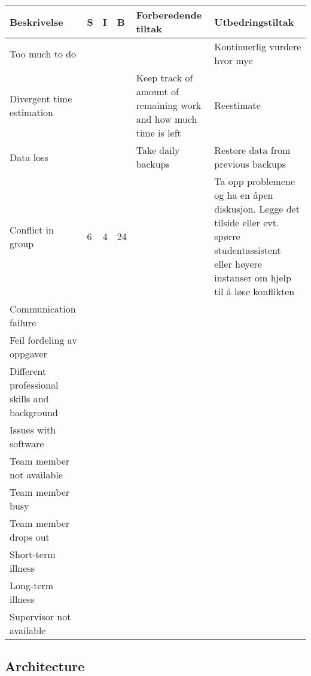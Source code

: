 \begin{table}[H]
\begin{tabular}{|p{4cm}|l|l|l|p{4.5cm}|p{4.5cm}|}
\hline
Beskrivelse  &S& I& B& Forberedende tiltak & Utbedringstiltak \\\hline
Too much to do&&&&& Kontinuerlig vurdere hvor mye \\\hline
Divergent time estimation & &&& Keep track of amount of remaining work and how much time is left & Reestimate\\\hline
Data loss&&&& Take daily backups &Restore data from previous backups\\\hline
Conflict in group& 6& 4& 24& &Ta opp problemene og ha en åpen diskusjon. Legge det tilside eller evt. spørre studentassistent eller høyere instanser om hjelp til å løse konflikten\\\hline
Communication failure &&&&&  \\\hline
Feil fordeling av oppgaver&&&&&\\\hline
Different professional skills and background&&&&&\\\hline
Issues with software &&&&&\\\hline
Team member not available &&&&&\\\hline
Team member busy &&&&&\\\hline
Team member drops out &&&&&\\\hline
Short-term illness &&&&&\\\hline
Long-term illness&&&&&\\\hline
Supervisor not available&&&&&\\\hline

\end{tabular}
\end{table}


\subsection{Architecture}
